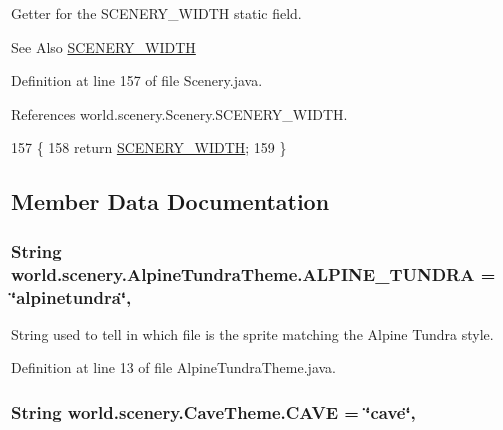 Getter for the S\-C\-E\-N\-E\-R\-Y\-\_\-\-W\-I\-D\-T\-H static field. 

\begin{DoxySeeAlso}{See Also}
\hyperlink{a00024_affb047c028883c6d069a03ef0f1caeb8}{S\-C\-E\-N\-E\-R\-Y\-\_\-\-W\-I\-D\-T\-H} 
\end{DoxySeeAlso}


Definition at line 157 of file Scenery.\-java.



References world.\-scenery.\-Scenery.\-S\-C\-E\-N\-E\-R\-Y\-\_\-\-W\-I\-D\-T\-H.


\begin{DoxyCode}
157                                         \{
158         \textcolor{keywordflow}{return} \hyperlink{a00024_affb047c028883c6d069a03ef0f1caeb8}{SCENERY\_WIDTH};
159     \}
\end{DoxyCode}


\subsection{Member Data Documentation}
\hypertarget{a00002_ad3c9b18e312ff348661fc1a42f28f7b6}{
\subsubsection[{A\-L\-P\-I\-N\-E\-\_\-\-T\-U\-N\-D\-R\-A}]{\setlength{\rightskip}{0pt plus 5cm}String world.\-scenery.\-Alpine\-Tundra\-Theme.\-A\-L\-P\-I\-N\-E\-\_\-\-T\-U\-N\-D\-R\-A = \char`\"{}alpinetundra\char`\"{}\hspace{0.3cm}{\ttfamily [static]}, {\ttfamily [inherited]}}}\label{a00002_ad3c9b18e312ff348661fc1a42f28f7b6}


String used to tell in which file is the sprite matching the Alpine Tundra style. 



Definition at line 13 of file Alpine\-Tundra\-Theme.\-java.

\hypertarget{a00004_abbad3655c1d1f230dddfd7ecc5194f50}{
\subsubsection[{C\-A\-V\-E}]{\setlength{\rightskip}{0pt plus 5cm}String world.\-scenery.\-Cave\-Theme.\-C\-A\-V\-E = \char`\"{}cave\char`\"{}\hspace{0.3cm}{\ttfamily [static]}, {\ttfamily [inherited]}}}\label{a00004_abbad3655c1d1f230dddfd7ecc5194f50}


